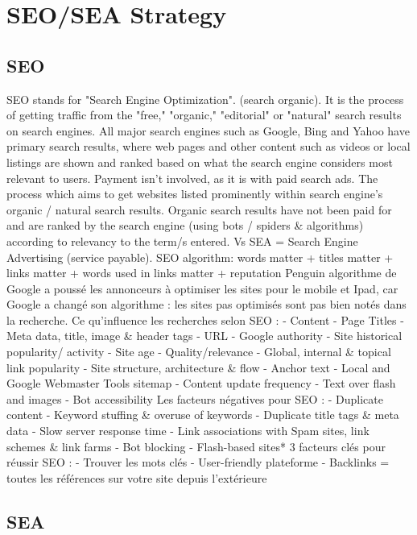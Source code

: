 \vspace{-1.2cm}

\section{SEO/SEA Strategy}

\subsection{SEO}

SEO stands for "Search Engine Optimization".  (search organic). It is the process of getting traffic from the
"free," "organic," "editorial" or "natural" search results on search engines. All major search engines such as
Google, Bing and Yahoo have primary search results, where web pages and other content such as videos or
local listings are shown and ranked based on what the search engine considers most relevant to users. Payment
isn't involved, as it is with paid search ads.
The process which aims to get websites listed prominently within search engine's organic / natural search
results. Organic search results have not been paid for and are ranked by the search engine (using bots / spiders
\& algorithms) according to relevancy to the term/s entered.
Vs SEA = Search Engine Advertising (service payable).
SEO algorithm: words matter + titles matter + links matter + words used in links matter + reputation
Penguin algorithme de Google a poussé les annonceurs à optimiser les sites pour le mobile et Ipad, car Google
a changé son algorithme : les sites pas optimisés sont pas bien notés dans la recherche.
Ce qu'influence les recherches selon SEO :
- Content
- Page Titles
- Meta data, title, image \& header tags
- URL
- Google authority
- Site historical popularity/ activity
- Site age
- Quality/relevance
- Global, internal \& topical link popularity
- Site structure, architecture \& flow
- Anchor text
- Local and Google Webmaster Tools sitemap
- Content update frequency
- Text over flash and images
- Bot accessibility
Les facteurs négatives pour SEO :
- Duplicate content
- Keyword stuffing \& overuse of keywords
- Duplicate title tags \& meta data
- Slow server response time
- Link associations with Spam sites, link schemes \& link farms
- Bot blocking
- Flash-based sites*
3 facteurs clés pour réussir SEO :
- Trouver les mots clés
- User-friendly plateforme
- Backlinks = toutes les références sur votre site depuis l'extérieure

\subsection{SEA}

